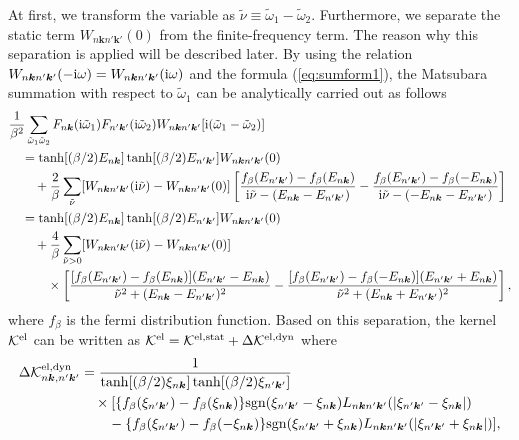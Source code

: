 At first, we transform the variable as $\tilde{\nu} \equiv \tilde{\omega}_1 - \tilde{\omega}_2$.
Furthermore, we separate the static term $W_{n\bm k n' \bm k'}(0)$ from the finite-frequency term.
The reason why this separation is applied will be described later.
By using the relation $W_{n \bm k n' \bm k'}(-{\rm i}\omega) = W_{n\bm k n' \bm k'}({\rm i}\omega)$
and the formula (\ref{eq:sumform1}),
the Matsubara summation with respect to $\tilde{\omega}_1$ can be analytically carried out as follows
%
\begin{equation}
	\begin{split}
	&\frac{1}{\beta^2}
	\sum_{\tilde{\omega}_1\tilde{\omega}_2}
	F_{n\bm k}({\rm i}\tilde\omega_1)F_{n'\bm k'}({\rm i}\tilde\omega_2)
	W_{n\bm kn'\bm k'}[{\rm i}(\tilde\omega_1 - \tilde\omega_2)] \\
	&\quad =
	\tanh[(\beta/2)E_{n\bm k}]\tanh[(\beta/2)E_{n' \bm k'}]W_{n\bm k n' \bm k'}(0) \\
	& \quad \quad +
	\frac{2}{\beta}\sum_{\tilde{\nu}}
	[W_{n\bm k n' \bm k'}({\rm i}\tilde{\nu}) - W_{n\bm k n' \bm k'}(0)]
	\left[ 
		\frac{f_\beta(E_{n'\bm k'}) - f_\beta(E_{n\bm k})}{ {\rm i}\tilde{\nu} - (E_{n\bm k}-E_{n'\bm k'})}
		- \frac{f_\beta(E_{n'\bm k'}) - f_\beta(-E_{n\bm k})}{ {\rm i}\tilde{\nu} - (-E_{n\bm k}-E_{n'\bm k'})}
	\right] \\
	& \quad =
	\tanh[(\beta/2)E_{n\bm k}]\tanh[(\beta/2)E_{n' \bm k'}]W_{n\bm k n' \bm k'}(0) \\
	& \quad \quad +
	\frac{4}{\beta}\sum_{\tilde{\nu} > 0}
	[W_{n\bm k n' \bm k'}({\rm i}\tilde{\nu}) - W_{n\bm k n' \bm k'}(0)] \\
	& \quad \quad \quad \times
	\left[ 
		\frac{[f_\beta(E_{n'\bm k'}) - f_\beta(E_{n\bm k})](E_{n'\bm k'} - E_{n\bm k})}
		{ \tilde{\nu}^2 + (E_{n\bm k}-E_{n'\bm k'})^2}
		-\frac{[f_\beta(E_{n'\bm k'}) - f_\beta(-E_{n\bm k})](E_{n'\bm k'} + E_{n\bm k})}
		{ \tilde{\nu}^2 + (E_{n\bm k}+E_{n'\bm k'})^2}
	\right], 
	\label{eq:nutrans}
\end{split}
\end{equation}
%
where $f_{\beta}$ is the fermi distribution function. Based on this separation, the kernel
${\mathcal K}^{\rm el}$ can be written as ${\mathcal K}^{\rm el} = {\mathcal K}^{\rm el,stat} +
\Delta{\mathcal K}^{\rm el,dyn}$ where
%
\begin{equation}
	\begin{split}
	\Delta{\mathcal K}^{\rm el,dyn}_{n\bm k, n'\bm k'} & =
	\frac{1}{\tanh[(\beta/2)\xi_{n\bm k}]\tanh[(\beta/2)\xi_{n'\bm k'}]} \\
	&\quad \times
	[ 
		\{f_{\beta}(\xi_{n'\bm k'}) - f_{\beta}(\xi_{n\bm k})\}{\rm sgn}(\xi_{n'\bm k'}-\xi_{n\bm k})
		L_{n\bm k n' \bm k'}(|\xi_{n'\bm k'}-\xi_{n\bm k}|) \\
	&\quad \quad -
	\{f_{\beta}(\xi_{n'\bm k'}) - f_{\beta}(-\xi_{n\bm k})\}{\rm sgn}(\xi_{n'\bm k'}+\xi_{n\bm k})
		L_{n\bm k n' \bm k'}(|\xi_{n'\bm k'}+\xi_{n\bm k}|) 
	],
	\label{eq:deltaKeldyn}
\end{split}
\end{equation}
